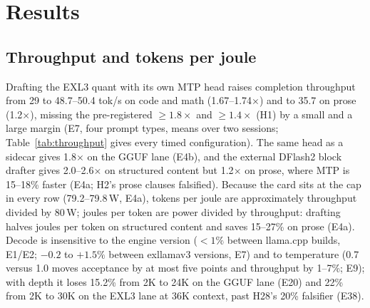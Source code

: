 \documentclass[11pt]{article}
\begin{document}
\section{Results}
\label{sec:results}

\subsection{Throughput and tokens per joule}
\label{sec:throughput}

Drafting the EXL3 quant with its own MTP head raises completion throughput from 29 to
48.7--50.4 tok/s on code and math (1.67--1.74$\times$) and to 35.7 on prose
(1.2$\times$), missing the pre-registered $\ge1.8\times$ and $\ge1.4\times$
(H1) by a small and a large margin (E7, four prompt types, means over two
sessions; Table~\ref{tab:throughput} gives every timed configuration). The
same head as a sidecar gives 1.8$\times$ on the GGUF lane (E4b), and the
external DFlash2 block drafter gives 2.0--2.6$\times$ on structured content
but 1.2$\times$ on prose, where MTP is 15--18\% faster (E4a; H2's prose
clauses falsified). Because the card sits at the cap in every row
(79.2--79.8\,W, E4a), tokens per joule are approximately throughput divided
by 80\,W; joules per token are power divided by throughput:
drafting halves joules per token on structured content and saves 15--27\% on
prose (E4a). Decode is insensitive to the engine version ($<1\%$ between
llama.cpp builds, E1/E2; $-0.2$ to $+1.5\%$ between exllamav3 versions, E7)
and to temperature (0.7 versus 1.0 moves acceptance by at most five points
and throughput by 1--7\%; E9); with depth it loses 15.2\% from 2K to 24K on
the GGUF lane (E20) and 22\% from 2K to 30K on the EXL3 lane at 36K context,
past H28's 20\% falsifier (E38).
\end{document}
